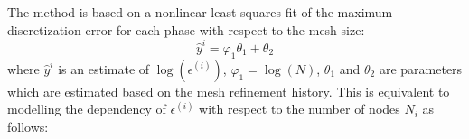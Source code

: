 \documentclass[a4paper,11pt]{report}    %
\begin{document}
% 




The method is based on a nonlinear least squares fit of the maximum discretization error for each phase with respect to the mesh size:
\[
    \hat y^{i} = \varphi_1 \theta_1 +\theta_2 
\]
where $\hat y^{i}$ is an estimate of $\log(\epsilon^{(i)})$,  $\varphi_1 = \log(N)$, $\theta_1$ and
$\theta_2$ are parameters which are estimated based on the mesh refinement history. This
is equivalent to modelling the dependency of $\epsilon^{(i)}$ with respect to the number of nodes  $N_i$ as follows:
\end{document}
